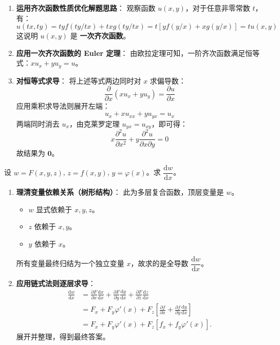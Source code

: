 \documentclass[lang=cn,11pt]{elegantbook}
\begin{document}
\begin{solution}
\begin{enumerate}
  \item \textbf{运用齐次函数性质优化解题思路}：
  观察函数 $u(x,y)$，对于任意非零常数 $t$，有：
  \[
  u(tx, ty) = ty f(ty/tx) + tx g(ty/tx) = t \left[ yf(y/x) + xg(y/x) \right] = tu(x,y)
  \]
  这说明 $u(x,y)$ 是 \textbf{一次齐次函数}。
  \item \textbf{应用一次齐次函数的 Euler 定理}：
  由欧拉定理可知，一阶齐次函数满足恒等式：$x u_x + y u_y = u$。
  \item \textbf{对恒等式求导}：
  将上述等式两边同时对 $x$ 求偏导数：
  \[
  \frac{\partial}{\partial x}(x u_x + y u_y) = \frac{\partial u}{\partial x}
  \]
  应用乘积求导法则展开左端：
  \[
  u_x + x u_{xx} + y u_{yx} = u_x
  \]
  两端同时消去 $u_x$，由克莱罗定理 $u_{yx} = u_{xy}$，即可得：
  \[
  x \frac{\partial^2 u}{\partial x^2} + y \frac{\partial^2 u}{\partial x \partial y} = 0
  \]
  故结果为 $\mathbf{0}$。
\end{enumerate}
\end{solution}



\begin{exercise}[全导数的树状链式法则]
设 $w=F(x,y,z)$, $z=f(x,y)$, $y=\varphi(x)$。求 $\dfrac{\mathrm{d}w}{\mathrm{d}x}$。
\end{exercise}

\begin{solution}
\begin{enumerate}
  \item \textbf{理清变量依赖关系（树形结构）}：
  此为多层复合函数，顶层变量是 $w$。
  \begin{itemize}
    \item $w$ 显式依赖于 $x, y, z$。
    \item $z$ 依赖于 $x, y$。
    \item $y$ 依赖于 $x$。
  \end{itemize}
  所有变量最终归结为一个独立变量 $x$，故求的是全导数 $\dfrac{\mathrm{d}w}{\mathrm{d}x}$。
  
  \item \textbf{应用链式法则逐层求导}：
  \begin{align*}
  \frac{\mathrm{d}w}{\mathrm{d}x} &= \frac{\partial F}{\partial x} \frac{\mathrm{d}x}{\mathrm{d}x} + \frac{\partial F}{\partial y} \frac{\mathrm{d}y}{\mathrm{d}x} + \frac{\partial F}{\partial z} \frac{\mathrm{d}z}{\mathrm{d}x} \\[6pt]
  &= F_x + F_y \varphi'(x) + F_z \left[ \frac{\partial f}{\partial x} + \frac{\partial f}{\partial y}\frac{\mathrm{d}y}{\mathrm{d}x} \right] \\[6pt]
  &= F_x + F_y \varphi'(x) + F_z \left[ f_x + f_y \varphi'(x) \right].
  \end{align*}
  展开并整理，得到最终答案。
\end{enumerate}
\end{solution}
\end{document}
